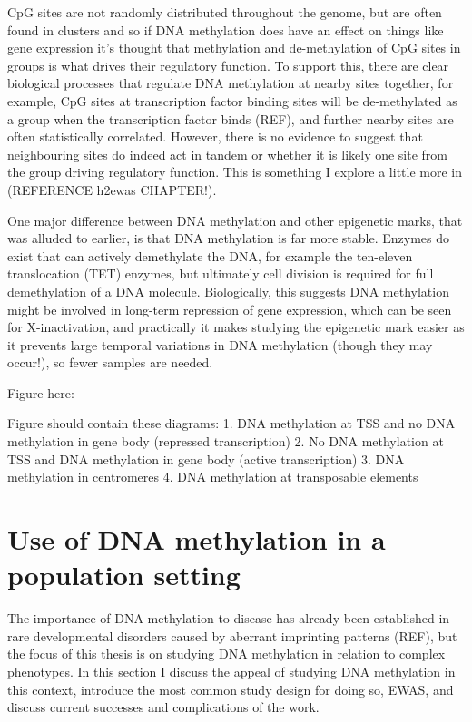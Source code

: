 \documentclass[11pt,twoside]{bristolthesis}
\begin{document}
CpG sites are not randomly distributed throughout the genome, but are often found in clusters and so if DNA methylation does have an effect on things like gene expression it's thought that methylation and de-methylation of CpG sites in groups is what drives their regulatory function. To support this, there are clear biological processes that regulate DNA methylation at nearby sites together, for example, CpG sites at transcription factor binding sites will be de-methylated as a group when the transcription factor binds (REF), and further nearby sites are often statistically correlated. However, there is no evidence to suggest that neighbouring sites do indeed act in tandem or whether it is likely one site from the group driving regulatory function. This is something I explore a little more in (REFERENCE h2ewas CHAPTER!).

One major difference between DNA methylation and other epigenetic marks, that was alluded to earlier, is that DNA methylation is far more stable. Enzymes do exist that can actively demethylate the DNA, for example the ten-eleven translocation (TET) enzymes, but ultimately cell division is required for full demethylation of a DNA molecule. Biologically, this suggests DNA methylation might be involved in long-term repression of gene expression, which can be seen for X-inactivation, and practically it makes studying the epigenetic mark easier as it prevents large temporal variations in DNA methylation (though they may occur!), so fewer samples are needed.

Figure here:

Figure should contain these diagrams:
1. DNA methylation at TSS and no DNA methylation in gene body (repressed transcription)
2. No DNA methylation at TSS and DNA methylation in gene body (active transcription)
3. DNA methylation in centromeres
4. DNA methylation at transposable elements

\hypertarget{dnam-phs}{%
\section{Use of DNA methylation in a population setting~}\label{dnam-phs}}

The importance of DNA methylation to disease has already been established in rare developmental disorders caused by aberrant imprinting patterns (REF), but the focus of this thesis is on studying DNA methylation in relation to complex phenotypes. In this section I discuss the appeal of studying DNA methylation in this context, introduce the most common study design for doing so, EWAS, and discuss current successes and complications of the work.
\end{document}
